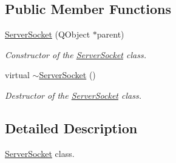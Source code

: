 \subsection*{Public Member Functions}
\begin{DoxyCompactItemize}
\item 
\hyperlink{class_network_1_1_server_socket_a587f7cef82e2ddbac70b5c8199ba024f}{Server\+Socket} (Q\+Object $\ast$parent)
\begin{DoxyCompactList}\small\item\em Constructor of the \hyperlink{class_network_1_1_server_socket}{Server\+Socket} class. \end{DoxyCompactList}\item 
virtual \hyperlink{class_network_1_1_server_socket_afb9b176dc5a73e644d6f2530672e72be}{$\sim$\+Server\+Socket} ()
\begin{DoxyCompactList}\small\item\em Destructor of the \hyperlink{class_network_1_1_server_socket}{Server\+Socket} class. \end{DoxyCompactList}\end{DoxyCompactItemize}


\subsection{Detailed Description}
\hyperlink{class_network_1_1_server_socket}{Server\+Socket} class. 

